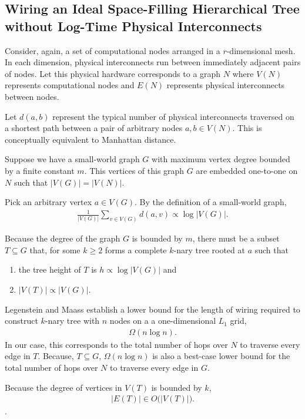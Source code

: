 \subsection{Wiring an Ideal Space-Filling Hierarchical Tree without Log-Time Physical Interconnects}

Consider, again, a set of computational nodes arranged in a $r$-dimensional mesh.
In each dimension, physical interconnects run between immediately adjacent pairs of nodes.
Let this physical hardware corresponds to a graph $N$ where $V(N)$ represents computational nodes and $E(N)$ represents physical interconnects between nodes.

Let $d(a,b)$ represent the typical number of physical interconnects traversed on a shortest path between a pair of arbitrary nodes $a, b \in V(N)$.
This is conceptually equivalent to Manhattan distance.

Suppose we have a small-world graph $G$ with maximum vertex degree bounded by a finite constant $m$.
This vertices of this graph $G$ are embedded one-to-one on $N$ such that $|V(G)| = |V(N)|$.

Pick an arbitrary vertex $a \in V(G)$.
By the definition of a small-world graph,
\begin{align*}
  \frac{1}{|V(G)|} \sum_{v \in V(G)} d(a, v) \propto \log |V(G)|.
\end{align*}

Because the degree of the graph $G$ is bounded by $m$, there must be a subset $T \subseteq G$ that, for some $k \geq 2$ forms a complete $k$-nary tree rooted at $a$ such that
\begin{enumerate}
  \item the tree height of $T$ is $h \propto \log |V(G)|$ and
  \item $|V(T)| \propto |V(G)|$.
\end{enumerate}

Legenstein and Maass \citep{legenstein2001optimizing} establish a lower bound for the length of wiring required to construct $k$-nary tree with $n$ nodes on a a one-dimensional $L_1$ grid,
\begin{align*}
\Omega(n \log n).
\end{align*}
In our case, this corresponds to the total number of hops over $N$ to traverse every edge in $T$.
Because, $T \subseteq G$, $\Omega(n \log n)$ is also a best-case lower bound for the total number of hops over $N$ to traverse every edge in $G$.

Because the degree of vertices in $V(T)$ is bounded by $k$,
\begin{align*}
|E(T)| \in O \Big( |V(T)| \Big).
\end{align*}.

